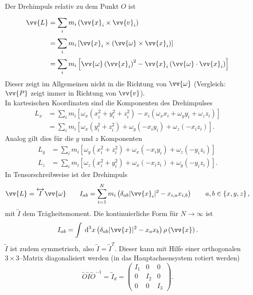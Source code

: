 \documentclass[a4paper,12pt]{article}
\newcommand{\td}{\,\text{d}}
\numberwithin{equation}{section}
\begin{document}
Der Drehimpuls relativ zu dem Punkt $O$ ist
\begin{align*}
        \vv{L}&=\sum_{i}^{}m_i\left(\vv{x}_i\times \vv{v}_i\right)\\
              &=\sum_{i}^{}m_i\left[\vv{x}_i\times \left(\vv{\omega }\times \vv{x}_i\right)\right]\\
              &=\sum_{i}^{}m_i\left[\vv{\omega }\left(\vv{x}_i\right)^2-\vv{x}_i\left(\vv{\omega }\cdot \vv{x}_i\right)\right]
\end{align*}
Dieser zeigt im Allgemeinen nicht in die Richtung von $\vv{\omega }$ (Vergleich: $\vv{P}$ zeigt immer in Richtung von $\vv{v}$).\\\indent
In kartesischen Koordinaten sind die Komponenten des Drehimpulses
\begin{align*}
        L_x&=\sum_{i}^{}m_i\left[\omega _x\left(x_i^2+y_i^2+z_i^2\right)-x_i\left(\omega _xx_i+\omega _yy_i+\omega _zz_i\right)\right]\\
           &=\sum_{i}^{}m_i\left[\omega _x\left(y_i^2+z_i^2\right)+\omega _y\left(-x_iy_i\right)+\omega _z\left(-x_iz_i\right)\right]
.\end{align*}
Analog gilt dies für die $y$ und $z$ Komponenten
\begin{align*}
        L_y&=\sum_{i}^{}m_i\left[\omega _y\left(x_i^2+z_i^2\right)+\omega _x\left(-x_iy_i\right)+\omega _z\left(-y_iz_i\right)\right]\\
        L_z&=\sum_{i}^{}m_i\left[\omega _z\left(x_i^2+y_i^2\right)+\omega _x\left(-x_iz_i\right)+\omega _y\left(-y_iz_i\right)\right]
.\end{align*}
In Tensorschreibweise ist der Drehimpuls
\[ 
        \vv{L}=\overleftrightarrow{I}\vv{\omega }\qquad I_{ab}=\sum_{i=1}^{N}m_i\left(\delta _{ab}|\vv{x}_i|^2-x_{i,a}x_{i,b}\right)\qquad a,b \in \left\{x,y,z\right\}
,\] 
mit $\overleftrightarrow{I}$ dem Trägheitsmoment. Die kontinuierliche Form für $N\rightarrow \infty$ ist 
\[ 
        I_{ab}=\int_{}^{}\td ^3x\left(\delta _{ab}|\vv{x}|^2-x_ax_b\right)\rho \left(\vv{x}\right)
.\] 
$\overleftrightarrow{I}$ ist zudem symmetrisch, also $\overleftrightarrow{I}=\overleftrightarrow{I}^T$. Dieser kann mit Hilfe einer orthogonalen $3\times 3$--Matrix diagonalisiert werden (in das Hauptachsensystem rotiert werden)
\[ 
        \overleftrightarrow{O}\overleftrightarrow{I}\overleftrightarrow{O}^{-1}=\overleftrightarrow{I}_d=\begin{pmatrix}
                I_1&0&0\\0&I_2&0\\0&0&I_3
        \end{pmatrix}
.\] 
\end{document}
